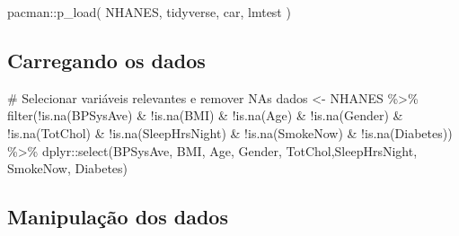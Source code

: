 \documentclass[
  letterpaper,
  DIV=11,
  numbers=noendperiod]{scrartcl}
\newenvironment{Shaded}{\begin{snugshade}}{\end{snugshade}}
\newcommand{\CommentTok}[1]{\textcolor[rgb]{0.37,0.37,0.37}{#1}}
\newcommand{\FunctionTok}[1]{\textcolor[rgb]{0.28,0.35,0.67}{#1}}
\newcommand{\NormalTok}[1]{\textcolor[rgb]{0.00,0.23,0.31}{#1}}
\newcommand{\OtherTok}[1]{\textcolor[rgb]{0.00,0.23,0.31}{#1}}
\newcommand{\SpecialCharTok}[1]{\textcolor[rgb]{0.37,0.37,0.37}{#1}}
\begin{document}
\begin{Shaded}
\begin{Highlighting}[]
\NormalTok{pacman}\SpecialCharTok{::}\FunctionTok{p\_load}\NormalTok{(}
\NormalTok{NHANES,}
\NormalTok{tidyverse,}
\NormalTok{car,}
\NormalTok{lmtest}
\NormalTok{  ) }
\end{Highlighting}
\end{Shaded}

\subsection{Carregando os dados}\label{carregando-os-dados-1}

\begin{Shaded}
\begin{Highlighting}[]
\CommentTok{\# Selecionar variáveis relevantes e remover NAs}
\NormalTok{dados }\OtherTok{\textless{}{-}}\NormalTok{ NHANES }\SpecialCharTok{\%\textgreater{}\%}
  \FunctionTok{filter}\NormalTok{(}\SpecialCharTok{!}\FunctionTok{is.na}\NormalTok{(BPSysAve) }\SpecialCharTok{\&} \SpecialCharTok{!}\FunctionTok{is.na}\NormalTok{(BMI) }\SpecialCharTok{\&} \SpecialCharTok{!}\FunctionTok{is.na}\NormalTok{(Age) }\SpecialCharTok{\&} \SpecialCharTok{!}\FunctionTok{is.na}\NormalTok{(Gender) }\SpecialCharTok{\&} 
           \SpecialCharTok{!}\FunctionTok{is.na}\NormalTok{(TotChol) }\SpecialCharTok{\&} \SpecialCharTok{!}\FunctionTok{is.na}\NormalTok{(SleepHrsNight) }\SpecialCharTok{\&} \SpecialCharTok{!}\FunctionTok{is.na}\NormalTok{(SmokeNow) }\SpecialCharTok{\&} \SpecialCharTok{!}\FunctionTok{is.na}\NormalTok{(Diabetes)) }\SpecialCharTok{\%\textgreater{}\%}
\NormalTok{  dplyr}\SpecialCharTok{::}\FunctionTok{select}\NormalTok{(BPSysAve, BMI, Age, Gender, TotChol,SleepHrsNight,  SmokeNow, Diabetes)}
\end{Highlighting}
\end{Shaded}

\subsection{Manipulação dos dados}\label{manipulauxe7uxe3o-dos-dados-1}
\end{document}
